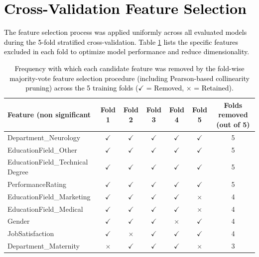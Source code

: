 \documentclass[a4paper,fleqn]{cas-sc}
\begin{document}
{\section{\textcolor{black}{Cross-Validation Feature Selection}}
\label{sec:appendix_features}
\textcolor{black}{The feature selection process was applied uniformly across all evaluated models during the 5-fold stratified cross-validation. Table \ref{tab:removed_features} lists the specific features excluded in each fold to optimize model performance and reduce dimensionality.}


\begin{table}[pos=h]
\footnotesize
    \centering
    \caption{\textcolor{black}{Frequency with which each candidate feature was removed by the fold-wise majority-vote feature selection procedure (including Pearson-based collinearity
pruning) across the 5 training folds ($\checkmark$ = Removed, $\times$ = Retained).}}
    \label{tab:removed_features}
    \begin{tabular}{@{}lcccccc@{}}
        \toprule
        \textbf{Feature (non significant} & \textbf{Fold 1} & \textbf{Fold 2} & \textbf{Fold 3} & \textbf{Fold 4} & \textbf{Fold 5} & \textbf{Folds removed (out of 5)} \\
        \midrule
        Department\_Neurology & $\checkmark$ & $\checkmark$ & $\checkmark$ & $\checkmark$ & $\checkmark$ & 5 \\
        EducationField\_Other & $\checkmark$ & $\checkmark$ & $\checkmark$ & $\checkmark$ & $\checkmark$ & 5 \\
        EducationField\_Technical Degree & $\checkmark$ & $\checkmark$ & $\checkmark$ & $\checkmark$ & $\checkmark$ & 5 \\
        PerformanceRating & $\checkmark$ & $\checkmark$ & $\checkmark$ & $\checkmark$ & $\checkmark$ & 5 \\
        EducationField\_Marketing & $\checkmark$ & $\checkmark$ & $\checkmark$ & $\checkmark$ & $\times$ & 4 \\
        EducationField\_Medical & $\checkmark$ & $\checkmark$ & $\checkmark$ & $\checkmark$ & $\times$ & 4 \\
        Gender & $\checkmark$ & $\checkmark$ & $\checkmark$ & $\times$ & $\checkmark$ & 4 \\
        JobSatisfaction & $\checkmark$ & $\times$ & $\checkmark$ & $\checkmark$ & $\checkmark$ & 4 \\
        Department\_Maternity & $\times$ & $\checkmark$ & $\checkmark$ & $\checkmark$ & $\times$ & 3 \\

\end{tabular}
\end{table}}
\end{document}
